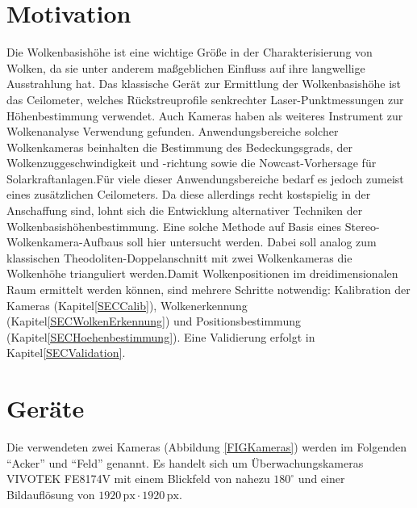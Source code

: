 \documentclass[a4paper,11pt,twoside,german]{article}
\newcommand{\absatz}{\smallbreak}
\begin{document}
\listoffigures %

\newpage


\section{Motivation}
Die Wolkenbasishöhe ist eine wichtige Größe in der Charakterisierung von Wolken,
da sie unter anderem maßgeblichen Einfluss auf ihre langwellige Ausstrahlung
hat.  Das klassische Gerät zur Ermittlung der Wolkenbasishöhe ist das
Ceilometer, welches Rückstreuprofile senkrechter Laser-Punktmessungen zur
Höhenbestimmung verwendet.  Auch Kameras haben als weiteres Instrument zur
Wolkenanalyse Verwendung gefunden. Anwendungsbereiche solcher Wolkenkameras
beinhalten die Bestimmung des Bedeckungsgrads, der Wolkenzuggeschwindigkeit und
-richtung sowie die Nowcast-Vorhersage für Solarkraftanlagen.\absatz Für viele
dieser Anwendungsbereiche bedarf es jedoch zumeist eines zusätzlichen
Ceilometers. Da diese allerdings recht kostspielig in der Anschaffung sind,
lohnt sich die Entwicklung alternativer Techniken der
Wolkenbasishöhenbestimmung. Eine solche Methode auf Basis eines
Stereo-Wolkenkamera-Aufbaus soll hier untersucht werden.  Dabei soll analog zum
klassischen Theodoliten-Doppelanschnitt mit zwei Wolkenkameras die Wolkenhöhe
trianguliert werden.\absatz Damit Wolkenpositionen im dreidimensionalen Raum
ermittelt werden können, sind mehrere Schritte notwendig: Kalibration der
Kameras (Kapitel\;\ref{SECCalib}), Wolkenerkennung
(Kapitel\;\ref{SECWolkenErkennung}) und Positionsbestimmung
(Kapitel\;\ref{SECHoehenbestimmung}). Eine Validierung erfolgt in
Kapitel\;\ref{SECValidation}.


\section{Geräte}
\label{SECGeraete}

Die verwendeten zwei Kameras (Abbildung \ref{FIGKameras}) werden im Folgenden
\enquote{Acker} und \enquote{Feld} genannt. Es handelt sich um
Überwachungskameras VIVOTEK FE8174V mit einem Blickfeld von nahezu $180^\circ$
und einer Bildauflösung von $1920\,\mathrm{px} \cdot 1920
\,\mathrm{px}$.
\absatz
\end{document}
